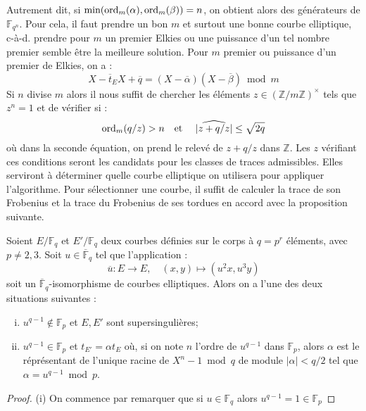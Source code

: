 \documentclass[a4paper]{article} %
\numberwithin{section}{part}
\numberwithin{equation}{section}
\newcommand\zmodninv[1]{(\mathbb{Z}/#1\mathbb{Z})^{\times}}
\newcommand\GF[1]{\mathbb{F}_{#1}}
\newcommand\ZZ{\mathbb{Z}}
\newcommand\etmath{\textup{\quad et \quad}}
\newcommand\ord[2]{\textup{ord}_{#1}(#2)}
\begin{document}
Autrement dit, si $\textup{min}(\ord{m}{\alpha},\ord{m}{\beta}) = n$, on obtient
alors des générateurs de $\GF{q^n}$. Pour cela, il faut prendre un bon $m$ et
surtout une bonne courbe elliptique, c-à-d. prendre pour $m$ un premier
Elkies ou une puissance d'un tel nombre premier semble être la meilleure
solution. Pour $m$ premier ou puissance d'un premier de Elkies, on a :
\begin{equation}
X - \overline{t}_EX + \overline{q} = (X - \overline{\alpha})(X -
\overline{\beta})\bmod m
\end{equation}
Si $n$ divise $m$ alors il nous suffit de chercher les éléments
$z\in\zmodninv{m}$ tels que $z^n = 1$ et de vérifier si :
\begin{equation}
\ord{m}{q/z} > n \etmath \vert{\widehat{z + q/z}}\vert\leq\sqrt{2q}
\end{equation}
où dans la seconde équation, on prend le relevé de $z + q/z$ dans $\ZZ$. Les $z$
vérifiant ces conditions seront les candidats pour les classes de traces
admissibles. Elles serviront à déterminer quelle courbe elliptique on utilisera
pour appliquer l'algorithme. Pour sélectionner une courbe, il suffit de calculer
la trace de son Frobenius et la trace du Frobenius de ses tordues en accord avec
la proposition suivante.
\begin{prop}
\label{prop:trtwist}
Soient $E/\GF{q}$ et $E'/\GF{q}$ deux courbes définies sur le corps à $q = p^r$
éléments, avec $p\neq2,3$. Soit $u\in\overline{\mathbb{F}}_q$ tel que 
l'application :
\begin{equation}
\overline{u} : E\longrightarrow E,\quad(x,y)\longmapsto(u^2x,u^3y)
\end{equation}
soit un $\overline{\mathbb{F}}_q$-isomorphisme de courbes elliptiques. Alors on 
a l'une des deux situations suivantes :
\begin{enumerate}[(i)]
    \item $u^{q-1}\notin\GF{p}$ et $E, E'$ sont supersingulières;
    \item $u^{q-1}\in\GF{p}$ et $t_{E'} = \alpha t_E$ où, si on note $n$ l'ordre
    de $u^{q-1}$ dans $\GF{p}$, alors $\alpha$ est le réprésentant de l'unique
    racine de $X^n - 1 \bmod q$ de module $\vert{\alpha}\vert < q/2$ tel que
    $\alpha = u^{q-1}\bmod p$.
\end{enumerate}
\end{prop}
\begin{proof}
(i) On commence par remarquer que si $u\in\GF{q}$ alors $u^{q-1} = 1\in\GF{p}$
\end{proof}
\end{document}
